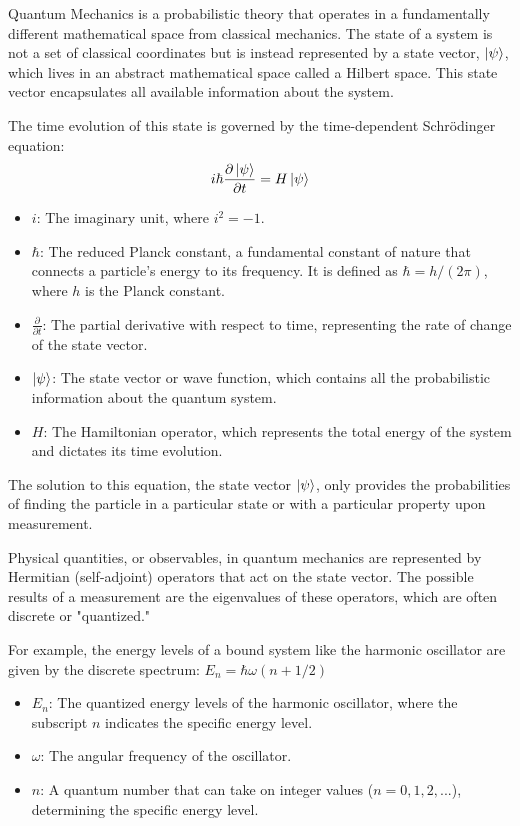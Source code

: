 \documentclass{article}
\begin{document}
Quantum Mechanics is a probabilistic theory that operates in a fundamentally different mathematical space from classical mechanics. The state of a system is not a set of classical coordinates but is instead represented by a state vector, $\ket{\psi}$, which lives in an abstract mathematical space called a Hilbert space. This state vector encapsulates all available information about the system.

The time evolution of this state is governed by the time-dependent Schrödinger equation:
\begin{equation}
i\hbar \frac{\partial \ket{\psi}}{\partial t} = H \ket{\psi}
\end{equation}

\begin{itemize}
	\item $i$: The imaginary unit, where $i^2 = -1$.
	\item $\hbar$: The reduced Planck constant, a fundamental constant of nature that connects a particle's energy to its frequency. It is defined as $\hbar = h / (2\pi)$, where $h$ is the Planck constant.
	\item $\frac{\partial}{\partial t}$: The partial derivative with respect to time, representing the rate of change of the state vector.
	\item $\ket{\psi}$: The state vector or wave function, which contains all the probabilistic information about the quantum system.
	\item $H$: The Hamiltonian operator, which represents the total energy of the system and dictates its time evolution.
\end{itemize}

The solution to this equation, the state vector $\ket{\psi}$, only provides the probabilities of finding the particle in a particular state or with a particular property upon measurement.


Physical quantities, or observables, in quantum mechanics are represented by Hermitian (self-adjoint) operators that act on the state vector. The possible results of a measurement are the eigenvalues of these operators, which are often discrete or "quantized."

For example, the energy levels of a bound system like the harmonic oscillator are given by the discrete spectrum:
$E_n = \hbar \omega(n+1/2)$

\begin{itemize}
	\item $E_n$: The quantized energy levels of the harmonic oscillator, where the subscript $n$ indicates the specific energy level.
	\item $\omega$: The angular frequency of the oscillator.
	\item $n$: A quantum number that can take on integer values ($n = 0, 1, 2, ...$), determining the specific energy level.
\end{itemize}
\end{document}
